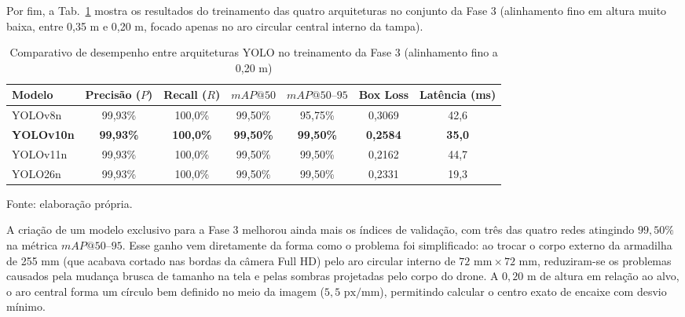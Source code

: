 Por fim, a Tab.~\ref{tab:comparativo_yolo_etapa3_alinhamento} mostra os resultados do treinamento das quatro arquiteturas no conjunto da Fase 3 (alinhamento fino em altura muito baixa, entre 0,35 m e 0,20 m, focado apenas no aro circular central interno da tampa).

\begin{table}[H]
	\centering
	\footnotesize
	\setlength{\tabcolsep}{3.5pt}
	\captionsetup{justification=centering}
	\caption{Comparativo de desempenho entre arquiteturas YOLO no treinamento da Fase 3 (alinhamento fino a 0,20 m)}
	\label{tab:comparativo_yolo_etapa3_alinhamento}
	\vspace{0.2cm}
	\begin{tabular}{lcccccc}
		\hline
		\textbf{Modelo} & \textbf{Precisão ($P$)} & \textbf{Recall ($R$)} & \textbf{$mAP@50$} & \textbf{$mAP@50\text{--}95$} & \textbf{Box Loss} & \textbf{Latência (ms)} \\
		\hline
		YOLOv8n   & 99,93\%    & 100,0\%    & 99,50\%    & 95,75\%         & 0,3069             & 42,6 \\
		\textbf{YOLOv10n}  & \textbf{99,93\%} & \textbf{100,0\%} & \textbf{99,50\%} & \textbf{99,50\%} & \textbf{0,2584} & \textbf{35,0} \\
		YOLOv11n  & 99,93\%    & 100,0\%    & 99,50\%    & 99,50\%         & 0,2162             & 44,7 \\
		YOLO26n   & 99,93\%    & 100,0\%    & 99,50\%    & 99,50\%         & 0,2331             & 19,3 \\
		\hline
	\end{tabular}
	\vspace{0.2cm}
	\begin{flushleft}
		\footnotesize Fonte: elaboração própria.
	\end{flushleft}
\end{table}

A criação de um modelo exclusivo para a Fase 3 melhorou ainda mais os índices de validação, com três das quatro redes atingindo $99,50\%$ na métrica $mAP@50\text{--}95$. Esse ganho vem diretamente da forma como o problema foi simplificado: ao trocar o corpo externo da armadilha de 255 mm (que acabava cortado nas bordas da câmera Full HD) pelo aro circular interno de $72\text{ mm} \times 72\text{ mm}$, reduziram-se os problemas causados pela mudança brusca de tamanho na tela e pelas sombras projetadas pelo corpo do drone. A $0,20\text{ m}$ de altura em relação ao alvo, o aro central forma um círculo bem definido no meio da imagem ($5,5\text{ px/mm}$), permitindo calcular o centro exato de encaixe com desvio mínimo.

